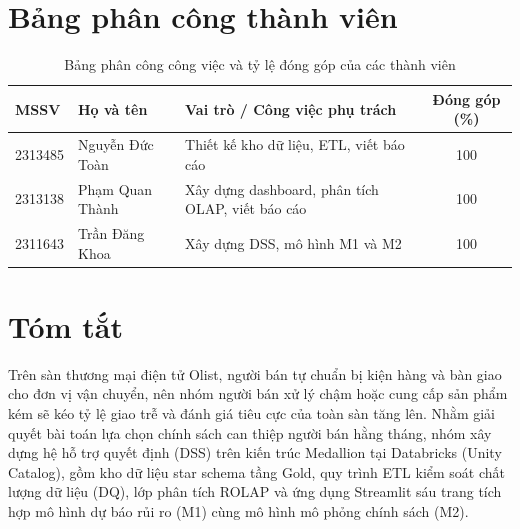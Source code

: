 \documentclass[a4paper]{article}
\begin{document}
\thispagestyle{empty}

\newpage
\tableofcontents
\newpage
\listoffigures
\listoftables
\newpage


{}
\section*{Bảng phân công thành viên}

\begin{table}[H]
\centering
\caption{Bảng phân công công việc và tỷ lệ đóng góp của các thành viên}
\label{tab:member_assignment}
\begin{tabularx}{\textwidth}{llXc}
\toprule
\textbf{MSSV} & \textbf{Họ và tên} & \textbf{Vai trò / Công việc phụ trách} & \textbf{Đóng góp (\%)} \\
\midrule
2313485 & Nguyễn Đức Toàn & Thiết kế kho dữ liệu, ETL, viết báo cáo & 100 \\
2313138 & Phạm Quan Thành & Xây dựng dashboard, phân tích OLAP, viết báo cáo & 100 \\
2311643 & Trần Đăng Khoa  & Xây dựng DSS, mô hình M1 và M2 & 100 \\
\bottomrule
\end{tabularx}
\end{table}

{}
\section*{Tóm tắt}

Trên sàn thương mại điện tử Olist, người bán tự chuẩn bị kiện hàng và bàn giao cho đơn vị vận chuyển, nên nhóm người bán xử lý chậm hoặc cung cấp sản phẩm kém sẽ kéo tỷ lệ giao trễ và đánh giá tiêu cực của toàn sàn tăng lên. Nhằm giải quyết bài toán lựa chọn chính sách can thiệp người bán hằng tháng, nhóm xây dựng hệ hỗ trợ quyết định (DSS) trên kiến trúc Medallion tại Databricks (Unity Catalog), gồm kho dữ liệu star schema tầng Gold, quy trình ETL kiểm soát chất lượng dữ liệu (DQ), lớp phân tích ROLAP và ứng dụng Streamlit sáu trang tích hợp mô hình dự báo rủi ro (M1) cùng mô hình mô phỏng chính sách (M2).
\end{document}
